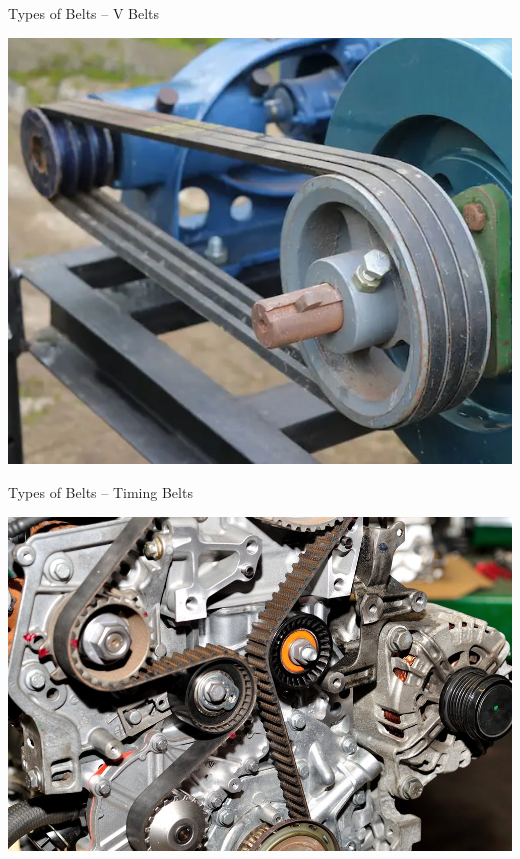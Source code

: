 \documentclass[10pt, svgnames]{beamer}
\begin{document}
\begin{frame}[label={sec:orgfa973e2}]{Types of Belts -- V Belts}
\begin{center}
\includegraphics[width=.9\linewidth]{./pictures/v-belts.png}
\end{center}
\end{frame}

\begin{frame}[label={sec:org4c2ee01}]{Types of Belts -- Timing Belts}
\begin{center}
\includegraphics[width=.9\linewidth]{./pictures/timing-belt.jpg}
\end{center}
\end{frame}
\end{document}
